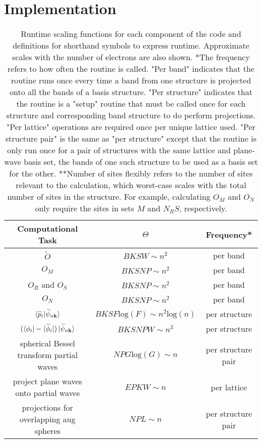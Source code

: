 \documentclass[12pt]{article}
\begin{document}
\section{Implementation}

\begin{table}
\centering
\caption{Runtime scaling functions for each component of the code and
definitions for shorthand symbols to express runtime. Approximate
scales with the number of electrons are also shown.
*The frequency refers to how often the routine is called. "Per band"
indicates that the routine runs once every time a band from one structure
is projected onto all the bands of a basis structure. "Per structure"
indicates that the routine is a "setup" routine that must be called once
for each structure and corresponding band structure to do perform projections. "Per lattice"
operations are required once per unique lattice used.
"Per structure pair" is the same as "per structure" except that the routine
is only run once for a pair of structures with the same lattice and plane-wave
basis set, the bands of one such structure to be used as a basis set for the other.
**Number of sites flexibly refers to the number of sites relevant to the calculation,
which worst-case scales with the total number of sites in the structure. For example,
calculating $O_M$ and $O_N$ only require the sites in sets $M$ and $N_RS$, respectively.}
\label{tab:runtime}

\begin{tabular}{|c|c|c|}
\hline
Computational Task & $\Theta$ & Frequency*\\
\hline
$\widetilde{O}$ & $BKSW \sim n^2$ & per band\\
$O_M$ & $BKSNP \sim n^2$ & per band\\
$O_R$ and $O_S$ & $BKSNP \sim n^2$ & per band\\
$O_N$ & $BKSNP \sim n^2$ & per band\\
$\braket{\widetilde{p}_i|\widetilde{\psi}_{n\mathbf{k}}}$ & $BKSF\mathrm{log}(F)
\sim n^2\mathrm{log}(n)$ & per structure\\
$(\bra{\phi_i}-\bra{\widetilde{\phi}_i})
\ket{\widetilde{\psi}_{n\mathbf{k}}}$ & $BKSNPW \sim n^3$ & per structure\\
spherical Bessel transform partial waves & $NPG\mathrm{log}(G) \sim n$ & per structure pair\\
project plane waves onto partial waves & $EPKW \sim n$ & per lattice\\
projections for overlapping aug spheres & $NPL \sim n$ & per structure pair\\
\hline
\end{tabular}


\end{table}
\end{document}
